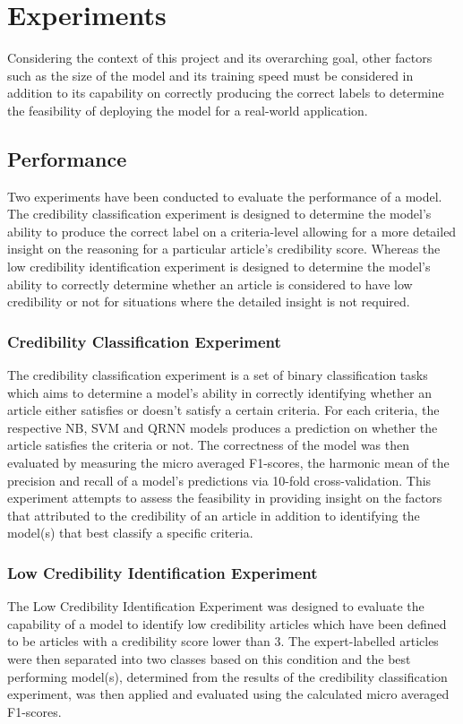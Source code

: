 \documentclass[a4paper,twoside,phd]{BYUPhys}
\begin{document}
\section{Experiments}
\label{sec:Experiments}

Considering the context of this project and its overarching goal, other factors such as the size of the model and its training speed must be considered in addition to its capability on correctly producing the correct labels to determine the feasibility of deploying the model for a real-world application. 

\subsection{Performance}
\label{sec:PerformanceExperiments}

Two experiments have been conducted to evaluate the performance of a model. The credibility classification experiment is designed to determine the model's ability to produce the correct label on a criteria-level allowing for a more detailed insight on the reasoning for a particular article's credibility score. Whereas the low credibility identification experiment is designed to determine the model's ability to correctly determine whether an article is considered to have low credibility or not for situations where the detailed insight is not required.

\subsubsection{Credibility Classification Experiment}
\label{sec:CredibilityClassificationExperiment}
The credibility classification experiment is a set of binary classification tasks which aims to determine a model's ability in correctly identifying whether an article either satisfies or doesn't satisfy a certain criteria. 
For each criteria, the respective NB, SVM and QRNN models produces a prediction on whether the article satisfies the criteria or not. The correctness of the model was then evaluated by measuring the micro averaged F1-scores, the harmonic mean of the precision and recall of a model's predictions via 10-fold cross-validation. This experiment attempts to assess the feasibility in providing insight on the factors that attributed to the credibility of an article in addition to identifying the model(s) that best classify a specific criteria.


\subsubsection{Low Credibility Identification Experiment}
\label{sec:LowCredibilityIdentification}
The Low Credibility Identification Experiment was designed to evaluate the capability of a model to identify low credibility articles which have been defined to be articles with a credibility score lower than 3. The expert-labelled articles were then separated into two  classes based on this condition and the best performing model(s), determined from the results of the credibility classification experiment, was then applied and evaluated using the calculated micro averaged F1-scores. \newline
\end{document}
